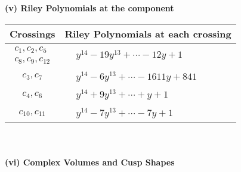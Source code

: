 \documentclass[1p]{elsarticle_modified}
\theoremstyle{definition}
\begin{document}
\newpage\renewcommand{\arraystretch}{1}
\flushleft \textbf{(v) Riley Polynomials at the component}\newline \\
\begin{tabular}{m{50pt}|m{274pt}}
Crossings & \hspace{64pt}Riley Polynomials at each crossing \\
\hline $$\begin{aligned}c_{1},c_{2},c_{5}\\c_{8},c_{9},c_{12}\end{aligned}$$&$\begin{aligned}
&y^{14}-19 y^{13}+\cdots-12 y+1
\end{aligned}$\\
\hline $$\begin{aligned}c_{3},c_{7}\end{aligned}$$&$\begin{aligned}
&y^{14}-6 y^{13}+\cdots-1611 y+841
\end{aligned}$\\
\hline $$\begin{aligned}c_{4},c_{6}\end{aligned}$$&$\begin{aligned}
&y^{14}+9 y^{13}+\cdots+y+1
\end{aligned}$\\
\hline $$\begin{aligned}c_{10},c_{11}\end{aligned}$$&$\begin{aligned}
&y^{14}-7 y^{13}+\cdots-7 y+1
\end{aligned}$\\
\hline
\end{tabular}\\~\\
\newpage\flushleft \textbf{(vi) Complex Volumes and Cusp Shapes}
\end{document}
